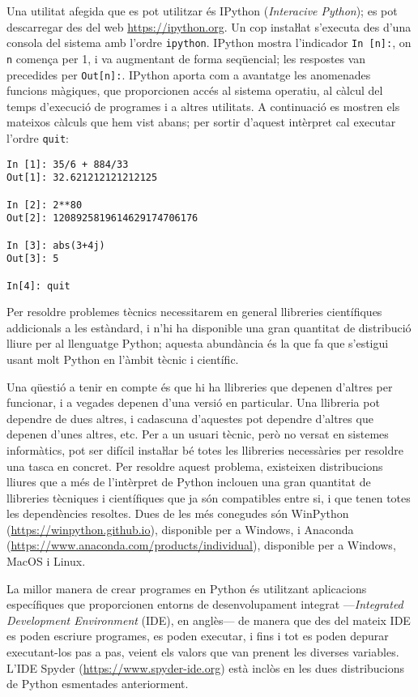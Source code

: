 Una utilitat afegida que es pot utilitzar és IPython (\textit{Interacive Python}); es pot descarregar des del web \href{https://ipython.org/}{https://ipython.org}. Un cop instaŀlat s'executa des d'una consola del sistema amb l'ordre \texttt{ipython}. IPython mostra l'indicador \texttt{In [n]:}, on \texttt{n} comença per 1, i va augmentant de forma seqüencial; les respostes van precedides per \texttt{Out[n]:}. IPython aporta com a avantatge les anomenades funcions màgiques, que proporcionen accés al sistema operatiu, al càlcul del temps d'execució de programes i a altres utilitats. A continuació es mostren els mateixos càlculs que hem vist abans; per sortir d'aquest intèrpret cal executar l'ordre \texttt{quit}:
\begin{lstlisting}
In [1]: 35/6 + 884/33
Out[1]: 32.621212121212125

In [2]: 2**80
Out[2]: 1208925819614629174706176

In [3]: abs(3+4j)
Out[3]: 5

In[4]: quit
\end{lstlisting}

Per resoldre problemes tècnics necessitarem en general llibreries científiques addicionals a les estàndard,  i n'hi ha disponible una gran quantitat de distribució lliure  per al llenguatge Python; aquesta abundància és la que fa que s'estigui usant molt Python en l'àmbit tècnic i científic.

Una qüestió a tenir en compte és que hi ha llibreries que depenen d'altres per funcionar, i a vegades  depenen d'una versió en particular. Una llibreria pot dependre de dues altres, i cadascuna d'aquestes pot dependre d'altres que depenen d'unes altres, etc. Per a un usuari tècnic, però no versat en sistemes informàtics, pot ser difícil instaŀlar bé totes les llibreries necessàries per resoldre una tasca en concret. Per resoldre aquest problema, existeixen distribucions lliures que a més de l'intèrpret de Python inclouen una gran quantitat de llibreries tècniques i científiques que ja són compatibles entre si, i que tenen totes les dependències resoltes. Dues de les més conegudes són WinPython (\href{https://winpython.github.io/}{https://winpython.github.io}), disponible  per a Windows, i
Anaconda (\href{https://www.anaconda.com/products/individual}{https://www.anaconda.com/products/individual}), disponible per a Windows, MacOS i Linux.



La millor manera de crear programes en Python és utilitzant aplicacions específiques que proporcionen entorns  de desenvolupament integrat ---\textit{Integrated Development Environment} (IDE), en anglès--- de manera que des del mateix IDE es poden escriure programes, es poden executar, i fins i tot es poden depurar executant-los pas a pas, veient els valors que van prenent les diverses variables. L'IDE Spyder (\href{https://www.spyder-ide.org/}{https://www.spyder-ide.org}) està inclòs en les dues distribucions de Python esmentades anteriorment. 

